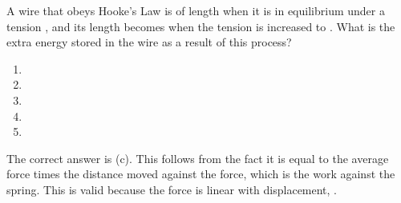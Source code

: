 
\begin{problem} 
{A wire that obeys Hooke's Law is of length  when it is in equilibrium under a tension , and its length becomes  when the tension is increased to . What is the extra energy stored in the wire as a result of this process?
\begin{enumerate}
	\item {}
	\item {}
	\item {}
	\item {}
	\item {}
\end{enumerate}
}
{}
{The correct answer is (c). This follows from the fact it is equal to the average force times the distance moved against the force, which is the work against the spring. This is valid because the force is linear with displacement, .}
\end{problem}